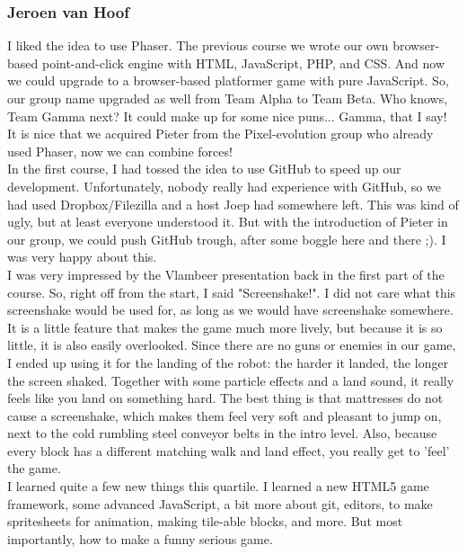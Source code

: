 \documentclass[a4paper,twoside,12pt]{article}
\begin{document}
\subsubsection{Jeroen van Hoof}

I liked the idea to use Phaser. The previous course we wrote our own browser-based point-and-click engine with HTML, JavaScript, PHP, and CSS. And now we could upgrade to a browser-based platformer game with pure JavaScript. So, our group name upgraded as well from Team Alpha to Team Beta. Who knows, Team Gamma next? It could make up for some nice puns... Gamma, that I say! It is nice that we acquired Pieter from the Pixel-evolution group who already used Phaser, now we can combine forces!\\

In the first course, I had tossed the idea to use GitHub to speed up our development. Unfortunately, nobody really had experience with GitHub, so we had used Dropbox/Filezilla and a host Joep had somewhere left. This was kind of ugly, but at least everyone understood it. But with the introduction of Pieter in our group, we could push GitHub trough, after some boggle here and there ;). I was very happy about this.\\

I was very impressed by the Vlambeer presentation back in the first part of the course. So, right off from the start, I said "Screenshake!". I did not care what this screenshake would be used for, as long as we would have screenshake somewhere. It is a little feature that makes the game much more lively, but because it is so little, it is also easily overlooked. Since there are no guns or enemies in our game, I ended up using it for the landing of the robot: the harder it landed, the longer the screen shaked. Together with some particle effects and a land sound, it really feels like you land on something hard. The best thing is that mattresses do not cause a screenshake, which makes them feel very soft and pleasant to jump on, next to the cold rumbling steel conveyor belts in the intro level. Also, because every block has a different matching walk and land effect, you really get to 'feel' the game.\\

I learned quite a few new things this quartile. I learned a new HTML5 game framework, some advanced JavaScript, a bit more about git, editors, to make spritesheets for animation, making tile-able blocks, and more. But most importantly, how to make a funny serious game.\\
\end{document}
